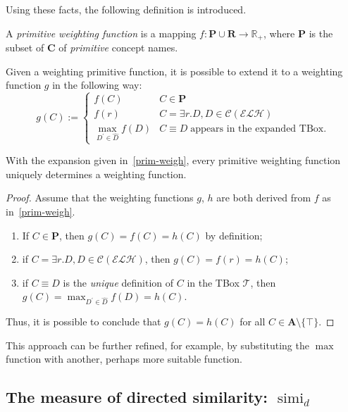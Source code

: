 \documentclass[]{llncs}
\DeclareMathOperator{\simi}{simi}
\begin{document}
  Using these facts, the following definition is introduced.
  \begin{definition}
    A \emph{primitive weighting function} is a mapping \(f \colon \mathbf{P} \cup \mathbf{R} \to \mathbb{R}_+\), where \(\mathbf{P}\) is the subset of \(\mathbf{C}\) of \emph{primitive} concept names.
  \end{definition}
  Given a weighting primitive function, it is possible to extend it to a weighting function \(g\) in the following way:
  \begin{equation}\label{prim-weigh}
    g(C) :=
    \begin{cases}
      f(C) & C \in \mathbf{P} \\
      f(r) & C = \exists{}r.D, D \in \mathcal{C}(\mathcal{ELH}) \\
      \max_{D^\prime \in \widehat{D}}f(D) & C \equiv D \; \text{appears in the expanded TBox.}
    \end{cases}
  \end{equation}
  \begin{proposition}
    With the expansion given in~\eqref{prim-weigh}, every primitive weighting function uniquely determines a weighting function.
  \end{proposition}
  \begin{proof}
    Assume that the weighting functions \(g\), \(h\) are both derived from \(f\) as in~\eqref{prim-weigh}.
    \begin{enumerate}
      \item If \(C \in \mathbf{P}\), then
      \(g(C) = f(C) = h(C)\) by definition;
      \item if \(C =  \exists{}r.D, D \in \mathcal{C}(\mathcal{ELH})\), then \(g(C) = f(r) = h(C)\);
      \item if \(C \equiv D\) is the \emph{unique} definition of \(C\) in the TBox \(\mathcal{T}\), then
      \(g(C) = \max_{D^\prime \in \widehat{D}}f(D) = h(C)\).
    \end{enumerate}
    Thus, it is possible to conclude that \(g(C) = h(C)\) for all \(C \in \mathbf{A} \setminus \lbrace \top \rbrace\).
  \end{proof}
  This approach can be further refined, for example, by substituting the \(\max\) function with another, perhaps more suitable function.

\subsection{The measure of directed similarity: \(\simi_d\)}
\end{document}
